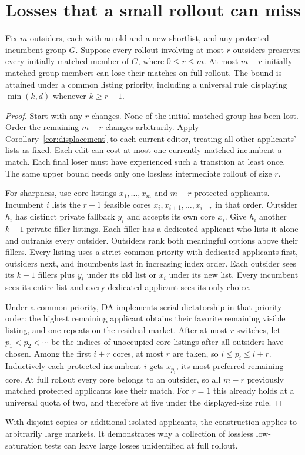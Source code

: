 \section{Losses that a small rollout can miss}
\begin{theorem}\label{thm:saturation-bound}
Fix $m$ outsiders, each with an old and a new shortlist, and any protected incumbent group $G$. Suppose every rollout involving at most $r$ outsiders preserves every initially matched member of $G$, where $0\le r\le m$. At most $m-r$ initially matched group members can lose their matches on full rollout. The bound is attained under a common listing priority, including a universal rule displaying $\min(k,d)$ whenever $k\ge r+1$.
\end{theorem}
\begin{proof}
Start with any $r$ changes. None of the initial matched group has been lost. Order the remaining $m-r$ changes arbitrarily. Apply Corollary~\ref{cor:displacement} to each current editor, treating all other applicants' lists as fixed. Each edit can cost at most one currently matched incumbent a match. Each final loser must have experienced such a transition at least once. The same upper bound needs only one lossless intermediate rollout of size $r$.

For sharpness, use core listings $x_1,\ldots,x_m$ and $m-r$ protected applicants. Incumbent $i$ lists the $r+1$ feasible cores $x_i,x_{i+1},\ldots,x_{i+r}$ in that order. Outsider $h_i$ has distinct private fallback $y_i$ and accepts its own core $x_i$. Give $h_i$ another $k-1$ private filler listings. Each filler has a dedicated applicant who lists it alone and outranks every outsider. Outsiders rank both meaningful options above their fillers. Every listing uses a strict common priority with dedicated applicants first, outsiders next, and incumbents last in increasing index order. Each outsider sees its $k-1$ fillers plus $y_i$ under its old list or $x_i$ under its new list. Every incumbent sees its entire list and every dedicated applicant sees its only choice.

Under a common priority, DA implements serial dictatorship in that priority order: the highest remaining applicant obtains their favorite remaining visible listing, and one repeats on the residual market. After at most $r$ switches, let $p_1<p_2<\cdots$ be the indices of unoccupied core listings after all outsiders have chosen. Among the first $i+r$ cores, at most $r$ are taken, so $i\le p_i\le i+r$. Inductively each protected incumbent $i$ gets $x_{p_i}$, its most preferred remaining core. At full rollout every core belongs to an outsider, so all $m-r$ previously matched protected applicants lose their match. For $r=1$ this already holds at a universal quota of two, and therefore at five under the displayed-size rule.
\end{proof}
With disjoint copies or additional isolated applicants, the construction applies to arbitrarily large markets. It demonstrates why a collection of lossless low-saturation tests can leave large losses unidentified at full rollout.


